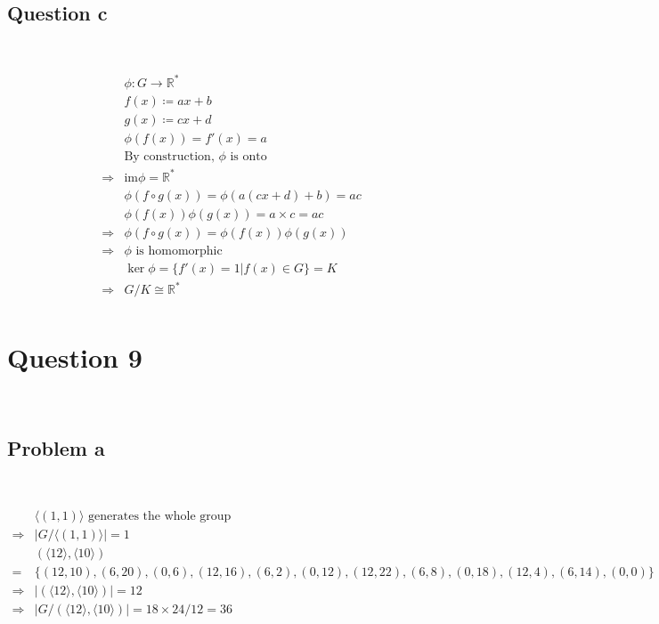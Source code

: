 \documentclass{article}
\begin{document}
~

\subsection*{Question c}

~

\begin{equation*}
    \begin{split}
        &\phi:G\rightarrow \mathbb{R} ^*\\
        &f(x)\coloneqq ax+b\\
        &g(x)\coloneqq cx+d\\
        &\phi(f(x))=f'(x)=a\\
        &\text{By construction, }\phi\text{ is onto}\\
        \Rightarrow&\text{im}\phi=\mathbb{R} ^*\\
        &\phi(f\circ g(x))=\phi(a(cx+d)+b)=ac\\
        &\phi(f(x))\phi(g(x))=a\times c=ac\\
        \Rightarrow&\phi(f\circ g(x))=\phi(f(x))\phi(g(x))\\
        \Rightarrow&\phi\text{ is homomorphic}\\
        &\ker\phi=\{f'(x)=1|f(x)\in G\}=K\\
        \Rightarrow&G/K\cong \mathbb{R} ^*\\
    \end{split}
\end{equation*}

\newpage

\section*{Question 9}

~

\subsection*{Problem a}

~

\begin{equation*}
    \begin{split}
        &\langle(1,1)\rangle\text{ generates the whole group}\\
        \Rightarrow&|G/\langle(1,1)\rangle|=1\\
        &(\langle12\rangle,\langle10\rangle)\\
        =&\{(12,10),(6,20),(0,6),(12,16),(6,2),(0,12),(12,22),(6,8),(0,18),(12,4),(6,14),(0,0)\}\\
        \Rightarrow&|(\langle12\rangle,\langle10\rangle)|=12\\
        \Rightarrow&|G/(\langle12\rangle,\langle10\rangle)|=18\times 24/12=36\\
    \end{split}
\end{equation*}
\end{document}
